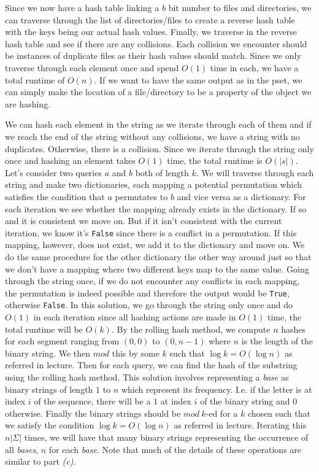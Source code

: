 \documentclass[12pt,twoside]{article}
\begin{document}
\begin{problems}
\begin{problemparts}
\problempart
Since we now have a hash table linking a $b$ bit number to files and directories, we can traverse through the list of directories/files to create a reverse hash table with the keys being our actual hash values. Finally, we traverse in the reverse hash table and see if there are any collisions. Each collision we encounter should be instances of duplicate files as their hash values should match. Since we only traverse through each element once and spend $O(1)$ time in each, we have a total runtime of $O(n)$. If we want to have the same output as in the pset, we can simply make the location of a file/directory to be a property of the object we are hashing.
\end{problemparts}
\problem  %
\begin{problemparts}
\problempart
We can hash each element in the string as we iterate through each of them and if we reach the end of the string without any collisions, we have a string with no duplicates. Otherwise, there is a collision. Since we iterate through the string only once and hashing an element takes $O(1)$ time, the total runtime is $O(|s|)$.
\problempart
Let's consider two queries $a$ and $b$ both of length $k$. We will traverse through each string and make two dictionaries, each mapping a potential permutation which satisfies the condition that $a$ permutates to $b$ and vice versa as a dictionary. For each iteration we see whether the mapping already exists in the dictionary. If so and it is consistent we move on. But if it isn't consistent with the current iteration, we know it's {\tt False} since there is a conflict in a permutation. If this mapping, however, does not exist, we add it to the dictionary and move on. We do the same procedure for the other dictionary the other way around just so that we don't have a mapping where two different keys map to the same value. Going through the string once, if we do not encounter any conflicts in each mapping, the permutation is indeed possible and therefore the output would be {\tt True}, otherwise {\tt False}. In this solution, we go through the string only once and do $O(1)$ in each iteration since all hashing actions are made in $O(1)$ time, the total runtime will be $O(k)$. 
\problempart
By the rolling hash method, we compute $n$ hashes for each segment ranging from $(0,0)$ to $(0,n-1)$ where $n$ is the length of the binary string. We then $mod$ this by some $k$ such that $\log k = O(\log n)$ as referred in lecture. Then for each query, we can find the hash of the substring using the rolling hash method.
\problempart
This solution involves representing a \emph{base} as binary strings of length $1$ to $n$ which represent its frequency. I.e. if the letter is at index $i$ of the sequence, there will be a $1$ at index $i$ of the binary string and $0$ otherwise. Finally the binary strings should be $mod\ k$-ed for a $k$ chosen such that we satisfy the condition $\log k = O(\log n)$ as referred in lecture. Iterating this $n | \Sigma |$ times, we will have that many binary strings representing the occurrence of all \emph{bases}, $n$ for each \emph{base}. Note that much of the details of these operations are similar to part \emph{(c)}.\\


\end{problemparts}
\end{problems}
\end{document}
